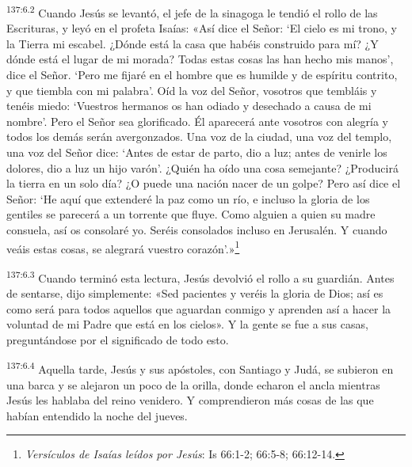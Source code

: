 \par
\textsuperscript{137:6.2} Cuando Jesús se levantó, el jefe de la sinagoga le tendió el rollo de las Escrituras, y leyó en el profeta Isaías: «Así dice el Señor: `El cielo es mi trono, y la Tierra mi escabel. ¿Dónde está la casa que habéis construido para mí? ¿Y dónde está el lugar de mi morada? Todas estas cosas las han hecho mis manos', dice el Señor. `Pero me fijaré en el hombre que es humilde y de espíritu contrito, y que tiembla con mi palabra'. Oíd la voz del Señor, vosotros que tembláis y tenéis miedo: `Vuestros hermanos os han odiado y desechado a causa de mi nombre'. Pero el Señor sea glorificado. Él aparecerá ante vosotros con alegría y todos los demás serán avergonzados. Una voz de la ciudad, una voz del templo, una voz del Señor dice: `Antes de estar de parto, dio a luz; antes de venirle los dolores, dio a luz un hijo varón'. ¿Quién ha oído una cosa semejante? ¿Producirá la tierra en un solo día? ¿O puede una nación nacer de un golpe? Pero así dice el Señor: `He aquí que extenderé la paz como un río, e incluso la gloria de los gentiles se parecerá a un torrente que fluye. Como alguien a quien su madre consuela, así os consolaré yo. Seréis consolados incluso en Jerusalén. Y cuando veáis estas cosas, se alegrará vuestro corazón'.»\footnote{\textit{Versículos de Isaías leídos por Jesús}: Is 66:1-2; 66:5-8; 66:12-14.}

\par
\textsuperscript{137:6.3} Cuando terminó esta lectura, Jesús devolvió el rollo a su guardián. Antes de sentarse, dijo simplemente: «Sed pacientes y veréis la gloria de Dios; así es como será para todos aquellos que aguardan conmigo y aprenden así a hacer la voluntad de mi Padre que está en los cielos». Y la gente se fue a sus casas, preguntándose por el significado de todo esto.

\par
\textsuperscript{137:6.4} Aquella tarde, Jesús y sus apóstoles, con Santiago y Judá, se subieron en una barca y se alejaron un poco de la orilla, donde echaron el ancla mientras Jesús les hablaba del reino venidero. Y comprendieron más cosas de las que habían entendido la noche del jueves.

